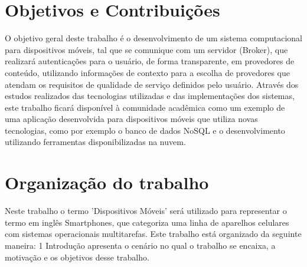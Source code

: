 \section{Objetivos e Contribuições}
O objetivo geral deste trabalho é o desenvolvimento de um sistema computacional para dispositivos móveis, tal que se comunique com um servidor (Broker), que realizará autenticações para o usuário, de forma transparente, em provedores de conteúdo, utilizando informações de contexto para a escolha de provedores que atendam os requisitos de qualidade de serviço definidos pelo usuário.
Através dos estudos realizados das tecnologias utilizadas e das implementações dos sistemas, este trabalho ficará disponível à comunidade acadêmica como um exemplo de uma aplicação desenvolvida para dispositivos móveis que utiliza novas tecnologias, como por exemplo o banco de dados NoSQL e o desenvolvimento utilizando ferramentas disponibilizadas na nuvem.

\section{Organização do trabalho}
Neste trabalho o termo 'Dispositivos Móveis' será utilizado para representar o termo em inglês Smartphones, que categoriza uma linha de aparelhos celulares com sistemas operacionais multitarefas.
Este trabalho está organizado da seguinte maneira: 1 Introdução apresenta o cenário no qual o trabalho se encaixa, a motivação e os objetivos desse trabalho.